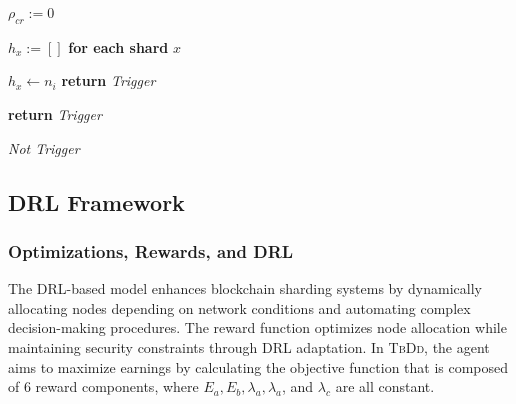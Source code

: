 \begin{algorithm}[t]  
\footnotesize
\caption{Shard risk evaluator}
\label{alg:1}
\LinesNumbered




$\rho_{cr} := 0$ 

$h_x := []$ \textbf{for each shard} $x$

\For{$x \in [1, D) $ }
    {
    \For{$n_i\in x \textbf{ and } i \in [1, N) $} 
    {   
        {$h_x\leftarrow n_i$}
    }
    {\textbf{return} \textit{Trigger}}     
}

            {\textbf{return} \textit{Trigger}}

\Return \textit{Not Trigger}

\end{algorithm}


\subsection{DRL Framework}
\subsubsection{Optimizations, Rewards, and DRL}
The DRL-based model enhances blockchain sharding systems by dynamically allocating nodes depending on network conditions and automating complex decision-making procedures. The reward function optimizes node allocation while maintaining security constraints through DRL adaptation. In \textsc{TbDd}, the agent aims to maximize earnings by calculating the objective function that is composed of $6$ reward components, where $E_{a}, E_{b}, \lambda_a, \lambda_a$, and $\lambda_c$ are all constant.

